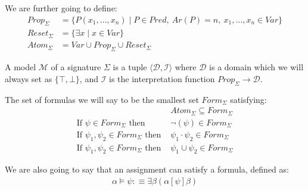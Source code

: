\documentclass[12pt]{article}
\begin{document}
We are further going to define:
%
\begin{align}
Prop_\Sigma &= \{P(x_1,\dots,x_n) \mid P \in Pred,\ Ar(P)=n,\ x_1,\dots,x_n\in Var\}\\
Reset_\Sigma &= \{\exists x \mid x\in Var\}\\
Atom_\Sigma &= Var \cup Prop_\Sigma \cup Reset_\Sigma
\end{align}

A model $\mathcal{M}$ of a signature $\Sigma$ is a tuple $\langle\mathcal{D},\mathcal{I}\rangle$ where $\mathcal{D}$ is a domain which we will always set as $\{\top,\bot\}$, and $\mathcal{I}$ is the interpretation function $Prop_\Sigma\to\mathcal{D}$.

The set of formulas we will say to be the smallest set $Form_\Sigma$ satisfying:
\begin{align}
&Atom_\Sigma \subseteq Form_\Sigma\\
\text{If } \psi\in Form_\Sigma \text{ then } &\neg(\psi)\in Form_\Sigma\\
\text{If } \psi_1,\psi_2\in Form_\Sigma \text{ then } &\psi_1\cdot\psi_2\in Form_\Sigma\\
\text{If } \psi_1,\psi_2\in Form_\Sigma \text{ then } &\psi_1\cup\psi_2\in Form_\Sigma
\end{align}

We are also going to say that an assignment can satisfy a formula, defined as:
\begin{align}
\alpha\models\psi :\equiv \exists\beta(\alpha[\psi]\beta)
\end{align}
\end{document}
